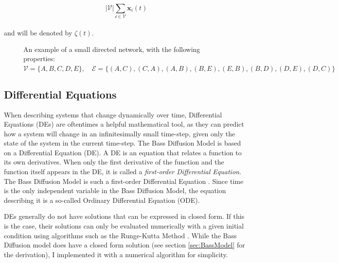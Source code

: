 \documentclass[11pt]{article}
\begin{document}
	$$
	|\mathcal{V}|\underset{\mathcal{i \in \mathcal{V}}}{\sum}\mathbf{x}_i(t)
	$$
	\\
	and will be denoted by $\zeta(t)$.
	
	\begin{figure}[H]
		\centering
		\caption{An example of a small directed network, with the following properties: $\mathcal{V}=\{ A,B,C,D,E \}, \quad \mathcal{E} = \{ (A,C), (C,A), (A,B), (B,E), (E,B), (B,D), (D,E), (D, C) \}$}
		\label{fig:network}
	\end{figure}
	
	\subsection{Differential Equations}
	When describing systems that change dynamically over time, Differential Equations (DEs) are oftentimes a helpful mathematical tool, as they can predict how a system will change in an infinitesimally small time-step, given only the state of the system in the current time-step. 
	The Bass Diffusion Model is based on a Differential Equation (DE). A DE is an equation that relates a function to its own derivatives. When only the first derivative of the function and the function itself appears in the DE, it is called a \textit{first-order Differential Equation}. The Bass Diffusion Model is such a first-order Differential Equation \autocite{Bass69}. Since time is the only independent variable in the Bass Diffusion Model, the equation describing it is a so-called Ordinary Differential Equation (ODE).
	
	DEs generally do not have solutions that can be expressed in closed form. If this is the case, their solutions can only be evaluated numerically with a given initial condition using algorithms such as the Runge-Kutta Method \autocite{Runge}. While the Bass Diffusion model does have a closed form solution (see section \ref{sec:BassModel} for the derivation), I implemented it with a numerical algorithm for simplicity.
	
\end{document}
